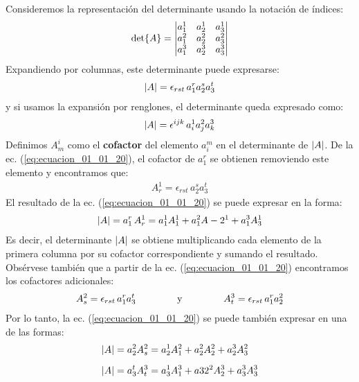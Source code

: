 \documentclass[hidelinks,12pt]{article}
\begin{document}
Consideremos la representación del determinante usando la notación de índices:
\begin{align*}
\det{A} = \mdet{
a_{1}^{1} & a_{2}^{1} & a_{3}^{1} \\
a_{1}^{2} & a_{2}^{2} & a_{3}^{2} \\
a_{1}^{3} & a_{2}^{3} & a_{3}^{3}}
\end{align*}
Expandiendo por columnas, este determinante puede expresarse:
\begin{align}
\abs{A} = \epsilon_{rst} \, a_{1}^{r} a_{2}^{s} a_{3}^{t}
\label{eq:ecuacion_01_01_20}
\end{align}
y si usamos la expansión por renglones, el determinante queda expresado como:
\begin{align}
\abs{A} = \epsilon^{ijk} \, a_{i}^{1} a_{j}^{2} a_{k}^{3}
\label{eq:ecuacion_01_01_21}
\end{align}
Definimos $A_{m}^{i}$ como el \textbf{cofactor} del elemento $a_{i}^{m}$ en el determinante de $\abs{A}$. De la ec. (\ref{eq:ecuacion_01_01_20}), el cofactor de $a_{1}^{r}$ se obtienen removiendo este elemento y encontramos que:
\begin{align}
A_{r}^{1} = \epsilon_{rst} \, a_{2}^{s} a_{3}^{t}
\label{eq:ecuacion_01_01_22}
\end{align}
El resultado de la ec. (\ref{eq:ecuacion_01_01_20}) se puede expresar en la forma:
\begin{align}
\abs{A} = a_{1}^{r} \, A_{r}^{1} = a_{1}^{1} A_{1}^{1} + a_{1}^{2} A-{2}^{1} + a_{1}^{3} A_{3}^{1}
\label{eq:ecuacion_01_01_23}
\end{align}
Es decir, el determinante $\abs{A}$ se obtiene multiplicando cada elemento de la primera columna por su cofactor correspondiente y sumando el resultado. Obsérvese también que a partir de la ec. (\ref{eq:ecuacion_01_01_20}) encontramos los cofactores adicionales:
\begin{align}
A_{s}^{2} = \epsilon_{rst} \, a_{1}^{r} a_{3}^{t} \hspace{1.5cm} \text{y} \hspace{1.5cm} A_{t}^{3} = \epsilon_{rst} \, a_{1}^{r} a_{2}^{2}
\label{eq:ecuacion_01_01_24}
\end{align}
Por lo tanto, la ec. (\ref{eq:ecuacion_01_01_20}) se puede también expresar en una de las formas:
\begin{align*}
\abs{A} &= a_{2}^{2} A_{s}^{2} = a_{2}^{1} A_{1}^{2} + a_{2}^{2} A_{2}^{2} + a_{2}^{3} A_{3}^{2} \\[0.5em]
\abs{A} &= a_{3}^{t} A_{t}^{3} = a_{3}^{1} A_{1}^{3} + a3{2}^{2} A_{2}^{3} + a_{3}^{3} A_{3}^{3}
\end{align*}
\end{document}
